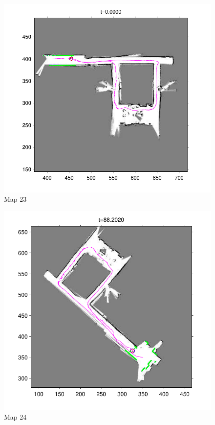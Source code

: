 \documentclass[twoside]{article}
\begin{document}
\begin{multicols}{2}
\begin{figure}[H]
\centering
\includegraphics[width=\columnwidth]{fig/map23.pdf}
\caption{Map 23}
\label{fig:map23}
\end{figure}

\begin{figure}[H]
\centering
\includegraphics[width=\columnwidth]{fig/map24.pdf}
\caption{Map 24}
\label{fig:map24}
\end{figure}


\end{multicols}
\end{document}
